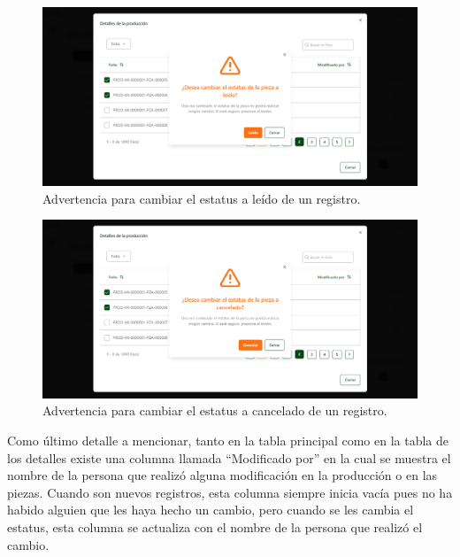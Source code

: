     \begin{figure}[H]
        \begin{center}
            \includegraphics[scale=0.33]{img/actividades/producciones/registro-leido.png}
            \caption{Advertencia para cambiar el estatus a leído de un registro.}
            \label{fig:registro-leido}
        \end{center}
    \end{figure}

    \begin{figure}[H]
        \begin{center}
            \includegraphics[scale=0.33]{img/actividades/producciones/registro-cancelado.png}
            \caption{Advertencia para cambiar el estatus a cancelado de un registro.}
            \label{fig:registro-cancelado}
        \end{center}
    \end{figure}

Como último detalle a mencionar, tanto en la tabla principal como en la tabla de los detalles existe una columna llamada ``Modificado por'' en la cual se muestra el nombre de la persona que realizó alguna modificación en la producción o en las piezas. Cuando son nuevos registros, esta columna siempre inicia vacía pues no ha habido alguien que les haya hecho un cambio, pero cuando se les cambia el estatus, esta columna se actualiza con el nombre de la persona que realizó el cambio. 